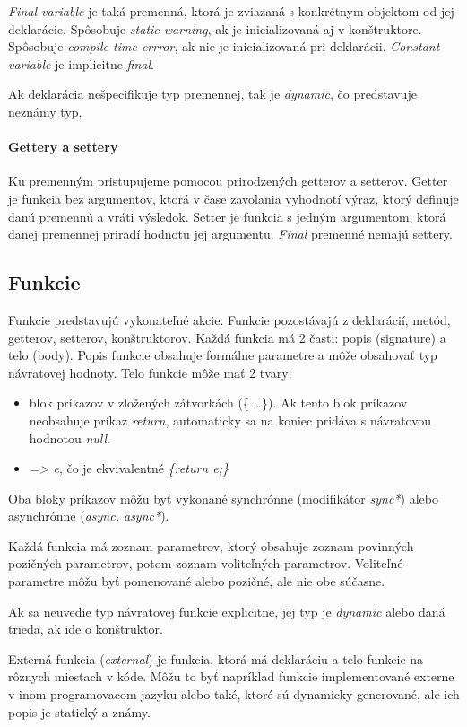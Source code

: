 \emph{Final variable} je taká premenná, ktorá je zviazaná s konkrétnym objektom od jej deklarácie. Spôsobuje \emph{static warning}, ak je inicializovaná aj v konštruktore. Spôsobuje \emph{compile-time errror}, ak nie je inicializovaná pri deklarácii.
\emph{Constant variable} je implicitne \emph{final}.

Ak deklarácia nešpecifikuje typ premennej, tak je \emph{dynamic}, čo predstavuje neznámy typ.

\paragraph{Gettery a settery}
\label{par:getters}
Ku premenným pristupujeme pomocou prirodzených getterov a setterov. 
Getter je funkcia bez argumentov, ktorá v čase zavolania vyhodnotí výraz, ktorý definuje danú premennú a vráti výsledok.
Setter je funkcia s jedným argumentom, ktorá danej premennej priradí hodnotu jej argumentu. \emph{Final} premenné nemajú settery.

\subsection{Funkcie}
Funkcie predstavujú vykonateľné akcie. Funkcie pozostávajú z deklarácií, metód, getterov, setterov, konštruktorov. %
Každá funkcia má 2 časti: popis (signature) a telo (body). Popis funkcie obsahuje formálne parametre a môže obsahovať typ návratovej hodnoty. Telo funkcie môže mať 2 tvary:
\begin{itemize}
\item blok príkazov v zložených zátvorkách (\{ \ldots \}). Ak tento blok príkazov neobsahuje príkaz \emph{return}, automaticky sa na koniec pridáva s návratovou hodnotou \emph{null}.
\item \emph{=> e}, čo je ekvivalentné \emph{\{return e;\}}
\end{itemize}
Oba bloky príkazov môžu byť vykonané synchrónne (modifikátor \emph{sync*}) alebo asynchrónne (\emph{async, async*}).

Každá funkcia má zoznam parametrov, ktorý obsahuje zoznam povinných pozičných parametrov, potom zoznam voliteľných parametrov. Voliteľné parametre môžu byť pomenované alebo pozičné, ale nie obe súčasne.

Ak sa neuvedie typ návratovej funkcie explicitne, jej typ je \emph{dynamic} alebo daná trieda, ak ide o konštruktor.

Externá funkcia (\emph{external}) je funkcia, ktorá má deklaráciu a telo funkcie na rôznych miestach v kóde. Môžu to byť napríklad funkcie implementované externe v inom programovacom jazyku alebo také, ktoré sú dynamicky generované, ale ich popis je statický a známy.

